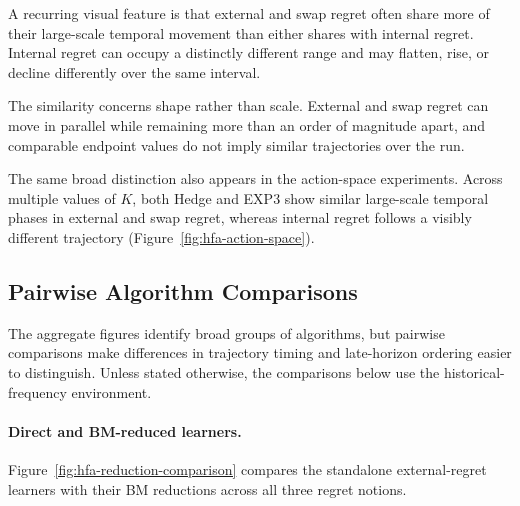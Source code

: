 A recurring visual feature is that external and swap regret often share more
of their large-scale temporal movement than either shares with internal
regret. Internal regret can occupy a distinctly different range and may
flatten, rise, or decline differently over the same interval.

The similarity concerns shape rather than scale. External and swap regret can
move in parallel while remaining more than an order of magnitude apart, and
comparable endpoint values do not imply similar trajectories over the run.

The same broad distinction also appears in the action-space experiments.
Across multiple values of \(K\), both Hedge and EXP3 show similar large-scale
temporal phases in external and swap regret, whereas internal regret follows a
visibly different trajectory (Figure~\ref{fig:hfa-action-space}).


\subsection{Pairwise Algorithm Comparisons}
\label{sec:selected-pairwise-comparisons}

The aggregate figures identify broad groups of algorithms, but pairwise
comparisons make differences in trajectory timing and late-horizon ordering
easier to distinguish. Unless stated otherwise, the comparisons below use
the historical-frequency environment.


\paragraph{Direct and BM-reduced learners.}

Figure~\ref{fig:hfa-reduction-comparison} compares the standalone
external-regret learners with their BM reductions across all three regret
notions.

